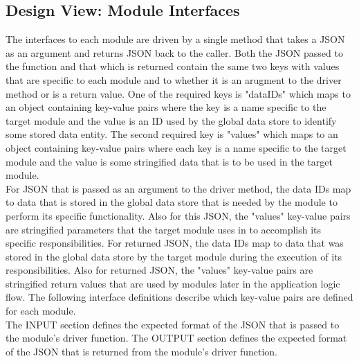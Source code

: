 \documentclass[onecolumn, draftclsnofoot,10pt, compsoc]{IEEEtran}
\begin{document}
    \subsection{Design View: Module Interfaces}
        The interfaces to each module are driven by a single method that takes a JSON as an argument and returns JSON back to the caller.
        Both the JSON passed to the function and that which is returned contain the same two keys with values that are specific to each module and to whether it is an arugment to the driver method or is a return value.
        One of the required keys is "dataIDs" which maps to an object containing key-value pairs where the key is a name specific to the target module and the value is an ID used by the global data store to identify some stored data entity.
        The second required key is "values" which maps to an object containing key-value pairs where each key is a name specific to the target module and the value is some stringified data that is to be used in the target module.
        \\[0.1in]
        For JSON that is passed as an argument to the driver method, the data IDs map to data that is stored in the global data store that is needed by the module to perform its specific functionality. 
        Also for this JSON, the "values" key-value pairs are stringified parameters that the target module uses in to accomplish its specific responsibilities.
        For returned JSON, the data IDs map to data that was stored in the global data store by the target module during the execution of its responsibilities.
        Also for returned JSON, the "values" key-value pairs are stringified return values that are used by modules later in the application logic flow.
        The following interface definitions describe which key-value pairs are defined for each module. 
        \\[0.1in]
        The INPUT section defines the expected format of the JSON that is passed to the module's driver function.
        The OUTPUT section defines the expected format of the JSON that is returned from the module's driver function.
\end{document}
